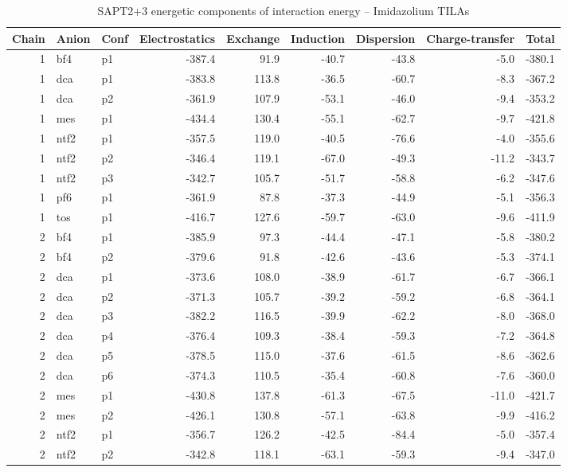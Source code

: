 \documentclass[a4paper]{article}
\begin{document}
\begin{table}[ht]
\centering
\footnotesize
\caption{SAPT2+3 energetic components of interaction energy -- Imidazolium TILAs}
\begin{tabular}{rllrrrrrr}
  \hline
Chain & Anion & Conf & Electrostatics & Exchange & Induction & Dispersion & Charge-transfer & Total \\ 
  \hline
   1 & bf4 & p1 & -387.4 & 91.9 & -40.7 & -43.8 & -5.0 & -380.1 \\ 
   1 & dca & p1 & -383.8 & 113.8 & -36.5 & -60.7 & -8.3 & -367.2 \\ 
   1 & dca & p2 & -361.9 & 107.9 & -53.1 & -46.0 & -9.4 & -353.2 \\ 
   1 & mes & p1 & -434.4 & 130.4 & -55.1 & -62.7 & -9.7 & -421.8 \\ 
   1 & ntf2 & p1 & -357.5 & 119.0 & -40.5 & -76.6 & -4.0 & -355.6 \\ 
   1 & ntf2 & p2 & -346.4 & 119.1 & -67.0 & -49.3 & -11.2 & -343.7 \\ 
   1 & ntf2 & p3 & -342.7 & 105.7 & -51.7 & -58.8 & -6.2 & -347.6 \\ 
   1 & pf6 & p1 & -361.9 & 87.8 & -37.3 & -44.9 & -5.1 & -356.3 \\ 
   1 & tos & p1 & -416.7 & 127.6 & -59.7 & -63.0 & -9.6 & -411.9 \\ 
   2 & bf4 & p1 & -385.9 & 97.3 & -44.4 & -47.1 & -5.8 & -380.2 \\ 
   2 & bf4 & p2 & -379.6 & 91.8 & -42.6 & -43.6 & -5.3 & -374.1 \\ 
   2 & dca & p1 & -373.6 & 108.0 & -38.9 & -61.7 & -6.7 & -366.1 \\ 
   2 & dca & p2 & -371.3 & 105.7 & -39.2 & -59.2 & -6.8 & -364.1 \\ 
   2 & dca & p3 & -382.2 & 116.5 & -39.9 & -62.2 & -8.0 & -368.0 \\ 
   2 & dca & p4 & -376.4 & 109.3 & -38.4 & -59.3 & -7.2 & -364.8 \\ 
   2 & dca & p5 & -378.5 & 115.0 & -37.6 & -61.5 & -8.6 & -362.6 \\ 
   2 & dca & p6 & -374.3 & 110.5 & -35.4 & -60.8 & -7.6 & -360.0 \\ 
   2 & mes & p1 & -430.8 & 137.8 & -61.3 & -67.5 & -11.0 & -421.7 \\ 
   2 & mes & p2 & -426.1 & 130.8 & -57.1 & -63.8 & -9.9 & -416.2 \\ 
   2 & ntf2 & p1 & -356.7 & 126.2 & -42.5 & -84.4 & -5.0 & -357.4 \\ 
   2 & ntf2 & p2 & -342.8 & 118.1 & -63.1 & -59.3 & -9.4 & -347.0 \\ 

\end{tabular}
\end{table}
\end{document}
